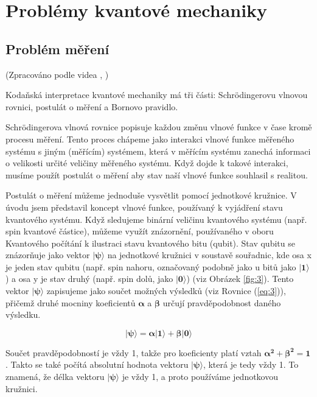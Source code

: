 \section{Problémy kvantové mechaniky}
    \subsection{Problém měření}
    (Zpracováno podle videa , \cite{measprob})

Kodaňská interpretace kvantové mechaniky má tři části: Schrödingerovu vlnovou rovnici, postulát o měření a Bornovo pravidlo.

Schrödingerova vlnová rovnice popisuje každou změnu vlnové funkce v čase kromě procesu měření. Tento proces chápeme jako interakci vlnové funkce měřeného systé\-mu s jiným (měřícím) systémem, která v měřícím systému zanechá informaci o velikosti určité veličiny měřeného systému. Když dojde k takové interakci, musíme použít postulát o měření aby stav naší vlnové funkce souhlasil s realitou.

Postulát o měření můžeme jednoduše vysvětlit pomocí jednotkové kružnice. V úvodu jsem představil koncept vlnové funkce, používaný k vyjádření stavu kvantového systému. Když sledujeme binární veličinu kvantového systému (např. spin kvantové částice), můžeme využít znázorně\-ní, používaného v oboru Kvantového počítání k ilustraci stavu kvantového bitu (qubit). Stav qubitu se znázorňuje jako vektor $\bm{|\psi\rangle}$ na jednotkové kružnici v soustavě souřadnic, kde osa x je jeden stav qubitu (např. spin nahoru, označovaný podobně jako u bitů jako $\bm{|1\rangle}$) a osa y je stav druhý (např. spin dolů, jako $\bm{|0\rangle}$) (viz Obrázek \ref{fig:3}). Tento vektor $\bm{|\psi\rangle}$ zapisujeme jako součet možných výsledků (viz Rovnice (\ref{eq:3})), přičemž druhé mocniny koeficientů $\bm{\alpha}$ a $\bm{\beta}$ určují pravděpodobnost daného výsledku. 

\begin{equation}
    \bm{|\psi\rangle = \alpha|1\rangle + \beta|0\rangle}
    \label{eq:3}
\end{equation}

Součet pravděpodobností je vždy 1, takže pro koeficienty platí vztah $\bm{\alpha^2 + \beta^2 = 1}$. Takto se také počítá absolutní hodnota vektoru $\bm{|\psi\rangle}$, která je tedy vždy 1. To znamená, že délka vektoru $\bm{|\psi\rangle}$ je vždy 1, a proto používáme jednotkovou kružnici. 

